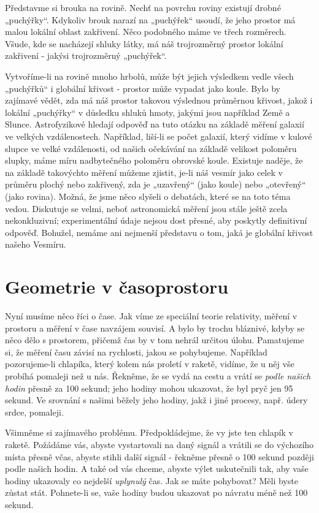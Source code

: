     Představme si brouka na rovině. Nechť na povrchu roviny existují drobné „puchýřky“. Kdykoliv 
    brouk narazí na „puchýřek“ usoudí, že jeho prostor má malou lokální oblast zakřivení. Něco 
    podobného máme ve třech rozměrech. Všude, kde se nacházejí shluky látky, má náš trojrozměrný 
    prostor lokální zakřivení - jakýsi trojrozměrný „puchýřek“. 
    
    Vytvoříme-li na rovině mnoho hrbolů, může být jejich výsledkem vedle všech „puchýřků“ i 
    globální křivost - prostor může vypadat jako koule. Bylo by zajímavé vědět, zda má náš prostor 
    takovou výslednou průměrnou křivost, jakož i lokální „puchýřky“ v důsledku shluků hmoty, jakými 
    jsou například Země a Slunce. Astrofyzikové hledají odpověď na tuto otázku na základě měření 
    galaxií ve velkých vzdálenostech. Například, liší-li se počet galaxií, který vidíme v kulové 
    slupce ve velké vzdálenosti, od našich očekávání na základě velikost poloměru slupky, máme míru 
    nadbytečného poloměru obrovské koule. Existuje naděje, že na základě takovýchto měření můžeme 
    zjistit, je-li náš vesmír jako celek v průměru plochý nebo zakřivený, zda je „uzavřený“ (jako 
    koule) nebo „otevřený“ (jako rovina). Možná, že jsme něco slyšeli o debatách, které se na toto 
    téma vedou. Diskutuje se velmi, neboť astronomická měření jsou stále ještě zcela nekonkluzivní; 
    experimentální údaje nejsou dost přesné, aby poskytly definitivní odpověď. Bohužel, nemáme ani 
    nejmenší představu o tom, jaká je globální křivost našeho Vesmíru.
    
  \section{Geometrie v časoprostoru}\label{fyz:IIchapXLIIsecIV}
    Nyní musíme něco říci o čase. Jak víme ze speciální teorie relativity, měření v prostoru a 
    měření v čase navzájem souvisí. A bylo by trochu bláznivé, kdyby se něco dělo s prostorem, 
    přičemž čas by v tom nehrál určitou úlohu. Pamatujeme si, že měření času závisí na rychlosti, 
    jakou se pohybujeme. Například pozorujeme-li chlapíka, který kolem nás proletí v raketě, 
    vidíme, že u něj vše probíhá pomaleji než u nás. Řekněme, že se vydá na cestu a vrátí se 
    \emph{podle našich hodin} přesně za \num{100} sekund; jeho hodiny mohou ukazovat, že byl pryč 
    jen \num{95} sekund. Ve srovnání s našimi běžely jeho hodiny, jakž i jiné procesy, např. údery 
    srdce, pomaleji.
    
    Všimněme si zajímavého problému. Předpokládejme, že vy jste ten chlapík v raketě. Požádáme vás, 
    abyste vystartovali na daný signál a vrátili se do výchozího místa přesně včas, abyste stihli 
    další signál - řekněme přesně o 100 sekund později podle našich hodin. A také od vás chceme, 
    abyste výlet uskutečnili tak, aby vaše hodiny ukazovaly co nejdelší \emph{uplynulý} čas. Jak se 
    máte pohybovat? Měli byste zůstat stát. Pohnete-li se, vaše hodiny budou ukazovat po návratu 
    méně než \num{100} sekund. 
    
